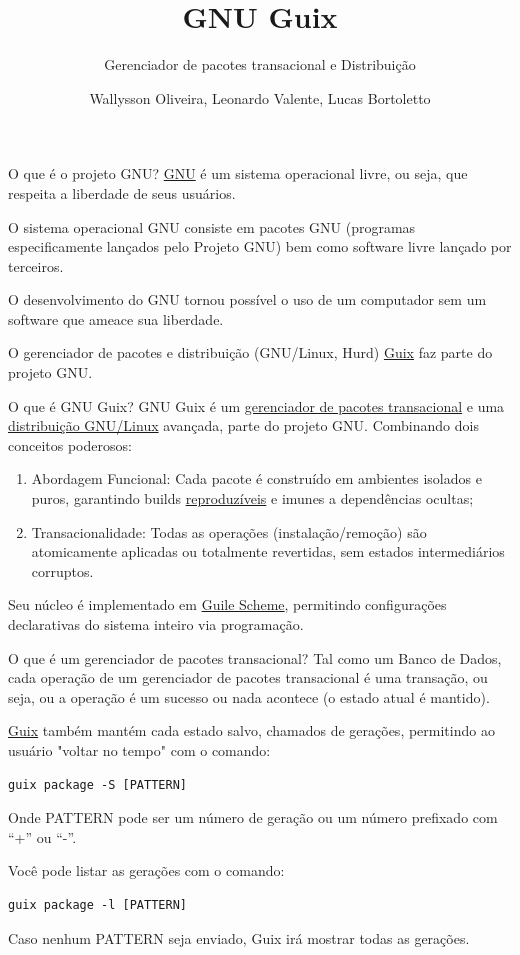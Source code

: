 \documentclass[bigger]{beamer}
\author{Wallysson Oliveira, Leonardo Valente, Lucas Bortoletto}
\date{}
\title{GNU Guix}
\subtitle{Gerenciador de pacotes transacional e Distribuição}
\begin{document}
\maketitle
\begin{frame}[label={sec:org63f3d59}]{O que é o projeto GNU?}
\href{https://www.gnu.org/home.en.html}{GNU} é um sistema operacional livre, ou seja, que respeita a liberdade de seus usuários.

O sistema operacional GNU consiste em pacotes GNU (programas especificamente lançados pelo Projeto GNU)
bem como software livre lançado por terceiros.

O desenvolvimento do GNU tornou possível o uso de um computador sem um software que ameace sua liberdade.

O gerenciador de pacotes e distribuição (GNU/Linux, Hurd) \href{https://guix.gnu.org/}{Guix} faz parte do projeto GNU.
\end{frame}
\begin{frame}[label={sec:orgad90efc}]{O que é GNU Guix?}
GNU Guix é um \href{https://guix.gnu.org}{gerenciador de pacotes transacional} e uma \href{https://guix.gnu.org/manual/en/html\_node/System-Installation.html}{distribuição GNU/Linux} avançada, parte do projeto GNU.
Combinando dois conceitos poderosos:

\begin{enumerate}
\item Abordagem Funcional: Cada pacote é construído em ambientes isolados e puros,
garantindo builds \href{https://guix.gnu.org/manual/en/html\_node/Features.html}{reproduzíveis} e imunes a dependências ocultas;
\item Transacionalidade: Todas as operações (instalação/remoção) são atomicamente aplicadas ou totalmente
revertidas, sem estados intermediários corruptos.
\end{enumerate}

Seu núcleo é implementado em \href{https://www.gnu.org/software/guile}{Guile Scheme}, permitindo configurações declarativas do sistema inteiro via
programação.
\end{frame}
\begin{frame}[label={sec:org63cf594},fragile]{O que é um gerenciador de pacotes transacional?}
 Tal como um Banco de Dados, cada operação de um gerenciador de pacotes transacional é uma transação, ou seja,
ou a operação é um sucesso ou nada acontece (o estado atual é mantido).

\href{https://guix.gnu.org/manual/en/html\_node/Package-Management.html}{Guix} também mantém cada estado salvo, chamados de gerações, permitindo ao usuário "voltar no tempo" com
o comando:
\begin{verbatim}
guix package -S [PATTERN]
\end{verbatim}
Onde PATTERN pode ser um número de geração ou um número prefixado com “+” ou “-”.

Você pode listar as gerações com o comando:
\begin{verbatim}
guix package -l [PATTERN]
\end{verbatim}
Caso nenhum PATTERN seja enviado, Guix irá mostrar todas as gerações.
\end{frame}
\end{document}
